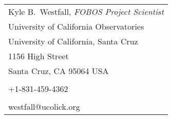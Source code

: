 \begin{table}[htp]
\begin{center}
\begin{tabular}{l}
    Kyle B.\ Westfall, \emph{FOBOS Project Scientist} \\
    University of California Observatories \\
    University of California, Santa Cruz \\
    1156 High Street\\
    Santa Cruz, CA 95064 USA \\
    \\
    +1-831-459-4362 \\ 
    \\
    {\ttfamily westfall@ucolick.org}
\end{tabular}
\end{center}
\end{table}%

